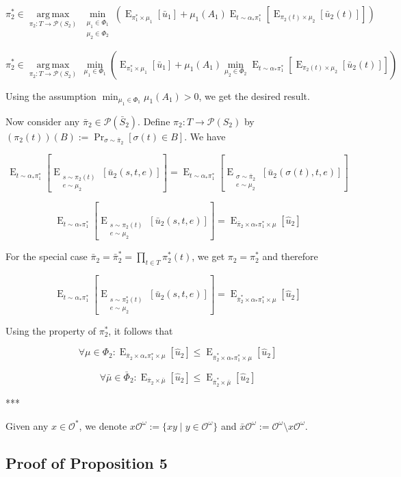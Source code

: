 \documentclass[a4paper]{article}
\DeclareMathOperator{\Prb}{Pr}
\DeclareMathOperator{\E}{E}
\newcommand{\EE}[2]{\operatorname{E}_{\substack{#1 \\ #2}}}
\newcommand{\Argmax}[1]{\underset{#1}{\operatorname{arg\,max}}\,}
\newcommand{\Prob}{\mathcal{P}}
\newcommand{\Obs}{\mathcal{O}}
\newcommand{\ObsO}{\Obs^\omega}
\begin{document}
$$\pi_2^* \in \Argmax{\pi_2: T \rightarrow \Prob(S_2)} \min_{\substack{\mu_1 \in \Phi_1 \\ \mu_2 \in \Phi_2}} (\E_{\pi_1^* \times \mu_1}[\bar{u}_1] + \mu_1(A_1) \E_{t \sim \alpha_*\pi_1^*}[\E_{\pi_2(t) \times \mu_2}[\bar{u}_2(t)]])$$

$$\pi_2^* \in \Argmax{\pi_2: T \rightarrow \Prob(S_2)} \min_{\mu_1 \in \Phi_1} (\E_{\pi_1^* \times \mu_1}[\bar{u}_1] + \mu_1(A_1) \min_{\mu_2 \in \Phi_2} \E_{t \sim \alpha_*\pi_1^*}[\E_{\pi_2(t) \times \mu_2}[\bar{u}_2(t)]])$$

Using the assumption ${\min_{\mu_1 \in \Phi_1} \mu_1(A_1) > 0}$, we get the desired result.

Now consider any ${\bar{\pi}_2 \in \Prob(\bar{S}_2)}$. Define ${\pi_2: T \rightarrow \Prob(S_2)}$ by ${(\pi_2(t))(B):=\Prb_{\sigma \sim \bar{\pi}_2}[\sigma(t) \in B]}$. We have

$$\E_{t \sim \alpha_*\pi_1^*}[\EE{s \sim \pi_2(t)}{e \sim \mu_2}[\bar{u}_2(s,t,e)]] = \E_{t \sim \alpha_*\pi_1^*}[\EE{\sigma \sim \bar{\pi}_2}{e \sim \mu_2}[\bar{u}_2(\sigma(t),t,e)]]$$

$$\E_{t \sim \alpha_*\pi_1^*}[\EE{s \sim \pi_2(t)}{e \sim \mu_2}[\bar{u}_2(s,t,e)]] = \E_{\bar{\pi}_2 \times \alpha_* \pi^*_1 \times \mu}[\hat{u}_2]$$

For the special case ${\bar{\pi}_2=\bar{\pi}^*_2=\prod_{t \in T} \pi_2^*(t)}$, we get ${\pi_2=\pi^*_2}$ and therefore

$$\E_{t \sim \alpha_*\pi_1^*}[\EE{s \sim \pi^*_2(t)}{e \sim \mu_2}[\bar{u}_2(s,t,e)]] = \E_{\bar{\pi}^*_2 \times \alpha_* \pi^*_1 \times \mu}[\hat{u}_2]$$

Using the property of ${\pi^*_2}$, it follows that

$$\forall \mu \in \Phi_2: \E_{\bar{\pi}_2 \times \alpha_* \pi^*_1 \times \mu}[\hat{u}_2] \leq \E_{\bar{\pi}^*_2 \times \alpha_* \pi^*_1 \times \mu}[\hat{u}_2]$$

$$\forall \bar{\mu} \in \bar{\Phi}_2: \E_{\bar{\pi}_2 \times \bar{\mu}}[\hat{u}_2] \leq \E_{\bar{\pi}^*_2 \times \bar{\mu}}[\hat{u}_2]$$

***

Given any ${x \in \Obs^*}$, we denote ${x\ObsO:=\{xy \mid y \in \ObsO\}}$ and ${\bar{x}\ObsO:=\ObsO \setminus x\ObsO}$.

\subsection{Proof of Proposition 5}
\end{document}
